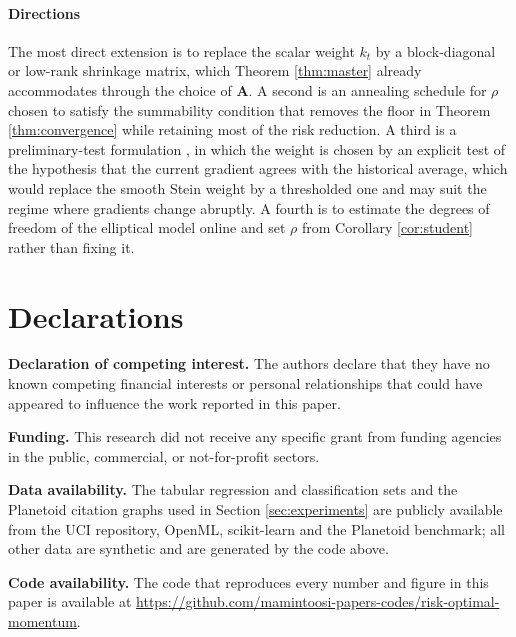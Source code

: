 \documentclass[a4paper,fleqn]{cas-sc}
\theoremstyle{plain}
\theoremstyle{definition}
\theoremstyle{remark}
\newcommand{\rev}[1]{#1}
\begin{document}
\paragraph{Directions}

The most direct extension is to replace the scalar weight $k_t$ by a block-diagonal or low-rank shrinkage matrix, which Theorem \ref{thm:master} already accommodates through the choice of $\bm A$. A second is an annealing schedule for $\rho$ chosen to satisfy the summability condition that removes the floor in Theorem \ref{thm:convergence} while retaining most of the risk reduction. A third is a preliminary-test formulation \citep{saleh2006, judge1978}, in which the weight is chosen by an explicit test of the hypothesis that the current gradient agrees with the historical average, which would replace the smooth Stein weight by a thresholded one and may suit the regime where gradients change abruptly. A fourth is to estimate the degrees of freedom of the elliptical model online and set $\rho$ from Corollary \ref{cor:student} rather than fixing it.




\section*{Declarations}

\textbf{Declaration of competing interest.} The authors declare that they have no known competing financial interests or personal relationships that could have appeared to influence the work reported in this paper.

\textbf{Funding.} This research did not receive any specific grant from funding agencies in the public, commercial, or not-for-profit sectors.

\rev{\textbf{Data availability.} The tabular regression and classification sets and the Planetoid citation graphs used in Section \ref{sec:experiments} are publicly available from the UCI repository, OpenML, scikit-learn and the Planetoid benchmark; all other data are synthetic and are generated by the code above.}

\rev{\textbf{Code availability.}} The code that reproduces every number and figure in this paper is available at \url{https://github.com/mamintoosi-papers-codes/risk-optimal-momentum}.
\end{document}

